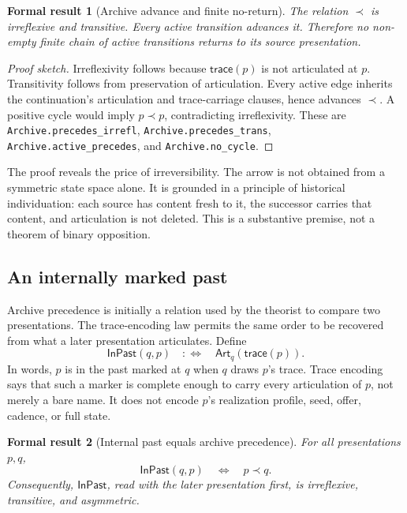 \documentclass[11pt]{article}
\newtheorem{formalresult}{Formal result}[section]
\theoremstyle{definition}
\theoremstyle{remark}
\newcommand{\lean}[1]{\nolinkurl{#1}}
\newcommand{\Art}{\mathsf{Art}}
\newcommand{\Trace}{\mathsf{trace}}
\begin{document}
\begin{formalresult}[Archive advance and finite no-return]
The relation \(\prec\) is irreflexive and transitive. Every active transition
advances it. Therefore no non-empty finite chain of active transitions returns
to its source presentation.
\end{formalresult}

\begin{proof}[Proof sketch]
Irreflexivity follows because \(\Trace(p)\) is not articulated at \(p\).
Transitivity follows from preservation of articulation. Every active edge
inherits the continuation's articulation and trace-carriage clauses, hence
advances \(\prec\). A positive cycle would imply \(p\prec p\), contradicting
irreflexivity. These are \lean{Archive.precedes_irrefl},
\lean{Archive.precedes_trans}, \lean{Archive.active_precedes}, and
\lean{Archive.no_cycle}.
\end{proof}

The proof reveals the price of irreversibility. The arrow is not obtained from
a symmetric state space alone. It is grounded in a principle of historical
individuation: each source has content fresh to it, the successor carries that
content, and articulation is not deleted. This is a substantive premise, not
a theorem of binary opposition.

\subsection{An internally marked past}

Archive precedence is initially a relation used by the theorist to compare two
presentations. The trace-encoding law permits the same order to be recovered
from what a later presentation articulates. Define
\[
  \mathsf{InPast}(q,p)
  \quad:\!\!\Longleftrightarrow\quad
  \Art_q(\Trace(p)).
\]
In words, \(p\) is in the past marked at \(q\) when \(q\) draws \(p\)'s trace.
Trace encoding says that such a marker is complete enough to carry every
articulation of \(p\), not merely a bare name. It does not encode \(p\)'s
realization profile, seed, offer, cadence, or full state.

\begin{formalresult}[Internal past equals archive precedence]
For all presentations \(p,q\),
\[
  \mathsf{InPast}(q,p)\quad\Longleftrightarrow\quad p\prec q.
\]
Consequently, \(\mathsf{InPast}\), read with the later presentation first, is
irreflexive, transitive, and asymmetric.
\end{formalresult}
\end{document}
